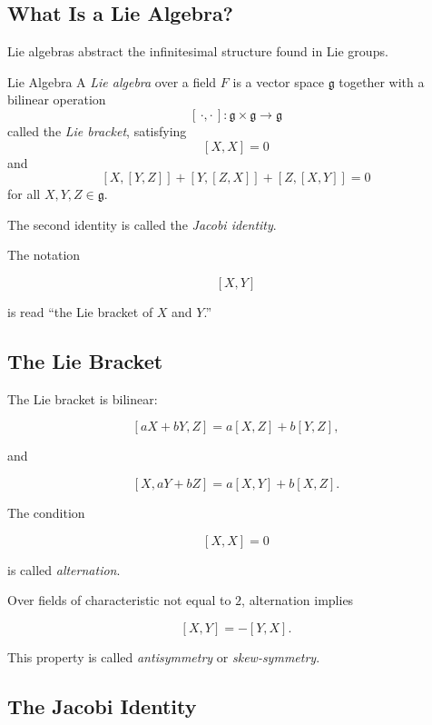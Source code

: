 \subsection{What Is a Lie Algebra?}
\label{subsec:lie-algebra-definition}

Lie algebras abstract the infinitesimal structure found in Lie groups.

\begin{definitionbox}{Lie Algebra}
A \emph{Lie algebra} over a field \(F\) is a vector space \(\mathfrak g\)
together with a bilinear operation
\[ [\,\cdot,\cdot\,]:\mathfrak g\times\mathfrak g\to\mathfrak g \]
called the \emph{Lie bracket}, satisfying
\[ [X,X]=0 \]
and
\[ [X,[Y,Z]]+[Y,[Z,X]]+[Z,[X,Y]]=0 \]
for all \(X,Y,Z\in\mathfrak g\).
\end{definitionbox}

The second identity is called the \emph{Jacobi identity}.

The notation

\[ [X,Y] \]

is read ``the Lie bracket of \(X\) and \(Y\).''

\subsection{The Lie Bracket}
\label{subsec:lie-bracket}

The Lie bracket is bilinear:

\[ [aX+bY,Z]=a[X,Z]+b[Y,Z], \]

and

\[ [X,aY+bZ]=a[X,Y]+b[X,Z]. \]

The condition

\[ [X,X]=0 \]

is called \emph{alternation}.

Over fields of characteristic not equal to \(2\), alternation implies

\[ [X,Y]=-[Y,X]. \]

This property is called \emph{antisymmetry} or \emph{skew-symmetry}.

\subsection{The Jacobi Identity}
\label{subsec:jacobi-identity}

